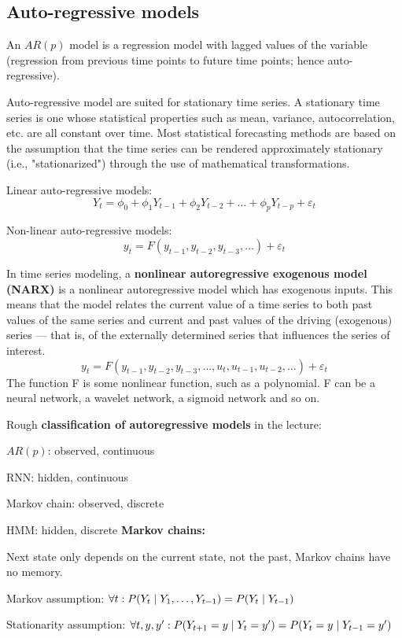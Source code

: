 \documentclass[12pt]{article}
\begin{document}
\subsection{Auto-regressive models}
\par An $AR(p)$ model is a regression model with lagged values of the variable (regression from previous time points to future time points; hence auto-regressive).
\par Auto-regressive model are suited for stationary time series. A stationary time series is one whose statistical properties such as mean, variance, autocorrelation, etc. are all constant over time. Most statistical forecasting methods are based on the assumption that the time series can be rendered approximately stationary (i.e., "stationarized") through the use of mathematical transformations.
\par Linear auto-regressive models:
\[ Y_t = \phi_0 + \phi_1 Y_{t-1}  + \phi_2 Y_{t-2} + \dots + \phi_p Y_{t-p} + \varepsilon_t \]
\par Non-linear auto-regressive models:
\[ y_t = F(y_{t-1},y_{t-2},y_{t-3},\dots) + \varepsilon_t \]
\par In time series modeling, a \textbf{nonlinear autoregressive exogenous model (NARX)} is a nonlinear autoregressive model which has exogenous inputs. This means that the model relates the current value of a time series to both past values of the same series and current and past values of the driving (exogenous) series — that is, of the externally determined series that influences the series of interest.
\[ y_t = F(y_{t-1},y_{t-2},y_{t-3},\dots ,u_{t},u_{t-1},u_{t-2},\dots) + \varepsilon_t \]
The function F is some nonlinear function, such as a polynomial. F can be a neural network, a wavelet network, a sigmoid network and so on.
\par Rough \textbf{classification of autoregressive models} in the lecture:
\ulb
\item $AR(p)$: observed, continuous
\item RNN: hidden, continuous
\item Markov chain: observed, discrete
\item HMM: hidden, discrete
\ule
\textbf{Markov chains:}
\ulb
\item Next state only depends on the current state, not the past, Markov chains have no memory.
\item Markov assumption: $ \forall t: P(Y_t \mid Y_1,\dots ,Y_{t-1}) = P(Y_t  \mid  Y_{t-1}) $
\item Stationarity assumption: $ \forall t,y,y': P(Y_{t+1}=y \mid Y_t = y') = P(Y_t = y \mid Y_{t-1} = y') $
\end{document}

